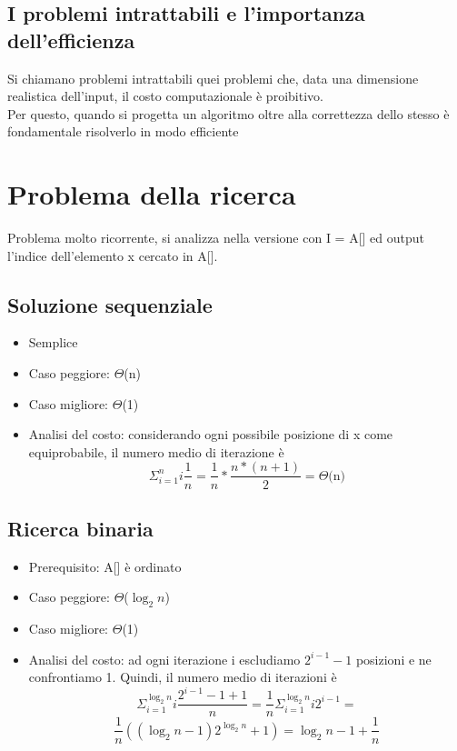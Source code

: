 \documentclass{report}
\newcommand{\T}[1]{$\Theta$(#1)}
\begin{document}
    \subsection{I problemi intrattabili e l'importanza dell'efficienza}
        Si chiamano problemi intrattabili quei problemi che, data una dimensione 
        realistica dell'input, il costo computazionale è proibitivo. \\
        Per questo, quando si progetta un algoritmo oltre alla correttezza dello
        stesso è fondamentale risolverlo in modo efficiente
\newpage
\section{Problema della ricerca}
    Problema molto ricorrente, si analizza nella versione con I = A[] ed output 
    l'indice dell'elemento x cercato in A[].
    \subsection{Soluzione sequenziale}
    \begin{itemize}
        \item Semplice
        \item Caso peggiore: \T{n}
        \item Caso migliore: \T{1}
        \item Analisi del costo: considerando ogni possibile posizione di x
            come equiprobabile, il numero medio di iterazione è 
            $$\Sigma_{i=1}^{n} i\frac{1}{n} = \frac{1}{n}*\frac{n*\left(n+1\right)}{2} = \textrm{\T{n}}$$
    \end{itemize}
    \subsection{Ricerca binaria}
    \begin{itemize}
        \item Prerequisito: A[] è ordinato
        \item Caso peggiore: \T{$\log_2n$}
        \item Caso migliore: \T{1}
        \item Analisi del costo: ad ogni iterazione i escludiamo $2^{i-1}-1$ posizioni
            e ne confrontiamo 1. Quindi, il numero medio di iterazioni è
            $$\Sigma_{i=1}^{\log_2n}i\frac{2^{i-1}-1 + 1}{n} = 
                \frac{1}{n}\Sigma_{i=1}^{\log_2n}i2^{i-1} = $$
            $$\frac{1}{n}\left(\left(\log_2n - 1\right)2^{\log_2n}+1\right) = 
                \log_2n - 1 + \frac{1}{n}$$
    \end{itemize}
\end{document}
